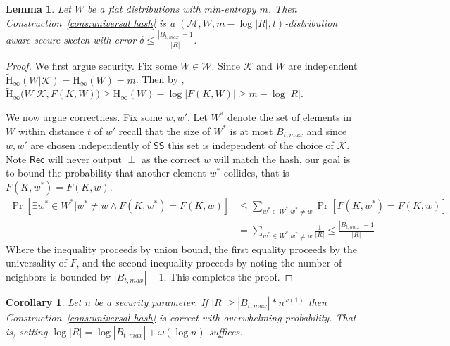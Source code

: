 \documentclass[11pt]{article}
\newcommand{\consref}[1]{\mbox{Construction~\ref{#1}}}
\newcommand{\class}[1]{{\ensuremath{\mathsf{#1}}}}
\newcommand{\sketch}{\ensuremath{\class{SS}}\xspace}
\newcommand{\rec}{\ensuremath{\class{Rec}}\xspace}
\newcommand{\Hoo}{\mathrm{H}_\infty}
\newcommand{\Hav}{\tilde{\mathrm{H}}_\infty}
\newtheorem{lemma}[theorem]{Lemma}
\newtheorem{corollary}[theorem]{Corollary}
\begin{document}
\begin{lemma}
Let $W$ be a flat distributions with min-entropy $m$.  Then
\consref{cons:universal hash} is a $(\mathcal{M}, W, m - \log |R|, t)$-distribution aware secure sketch with error $\delta \le \frac{|B_{t, max}|-1}{|R|}$. 
\end{lemma}
\begin{proof}
We first argue security.  Fix some $W\in\mathcal{W}$. Since $\mathcal{K}$ and $W$ are independent $\Hav(W | \mathcal{K}) = \Hoo(W) = m$.  Then by \cite[Lemma 2.2b]{DBLP:journals/siamcomp/DodisORS08}, $\Hav(W | \mathcal{K}, F(K, W)) \ge \Hoo(W) - \log |F(K, W)| \ge m - \log |R|$.

We now argue correctness.  Fix some $w, w'$.  Let $W^*$ denote the set of elements in $W$ within distance $t$ of $w'$ recall that the size of $W^*$ is at most $B_{t, max}$ and since $w, w'$ are chosen independently of $\sketch$ this set is independent of the choice of $\mathcal{K}$.  Note $\rec$ will never output $\perp$ as the correct $w$ will match the hash, our goal is to bound the probability that another element $w^*$ collides, that is $F(K, w^*) = F(K, w)$.
\begin{align*}
\Pr[\exists w^* \in W^* |w^* \neq w \wedge F(K, w^*) = F(K, w)] &\le \sum_{w^*\in W^* | w^*\neq w} \Pr[F(K, w^*) = F(K, w)] \\
 &= \sum_{w^*\in W^* | w^*\neq w} \frac{1}{|R|} \le \frac{|B_{t, max}|-1}{|R|}
\end{align*}
Where the inequality proceeds by union bound, the first equality proceeds by the universality of $F$, and the second inequality proceeds by noting the number of neighbors is bounded by $|B_{t, max}|-1$.  This completes the proof.
\end{proof}
\begin{corollary}
Let $n$ be a security parameter.  
If $|R| \ge |B_{t, max}|* n^{\omega(1)}$ then \consref{cons:universal hash} is correct with overwhelming probability.  That is, setting $\log |R| = \log |B_{t, max}| + \omega(\log n)$ suffices.
\end{corollary}
\end{document}
